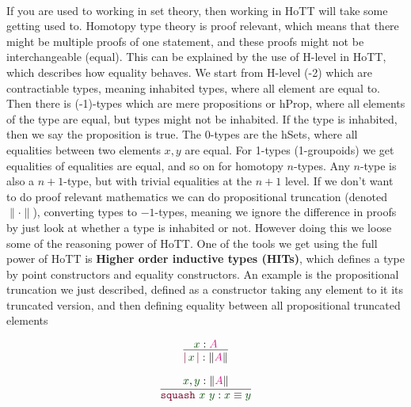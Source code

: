 \documentclass[twoside,11pt,openright]{report}
\theoremstyle{plain} %
\theoremstyle{definition}
\theoremstyle{remark}
\newcommand*{\term}[1]{\textcolor{green!30!black}{#1}} %
\newcommand*{\type}[1]{\textcolor{magenta!90!black}{#1}}
\newcommand*{\constructor}[1]{\textcolor{purple!60!black}{\ensuremath{\mathtt{#1}}}}
\begin{document}
\\ 
If you are used to working in set theory, then working in HoTT will take some getting used to. Homotopy type theory is proof relevant, which means that there might be multiple proofs of one statement, and these proofs might not be interchangeable (equal). This can be explained by the use of H-level in HoTT, which describes how equality behaves. We start from H-level (-2) which are contractiable types, meaning inhabited types, where all element are equal to. Then there is (-1)-types which are mere propositions or hProp, where all elements of the type are equal, but types might not be inhabited. If the type is inhabited, then we say the proposition is true. The 0-types are the hSets, where all equalities between two elements \(x,y\) are equal. For 1-types (1-groupoids) we get equalities of equalities are equal, and so on for homotopy \(n\)-types. Any \(n\)-type is also a \(n+1\)-type, but with trivial equalities at the \(n+1\) level. If we don't want to do proof relevant mathematics we can do propositional truncation (denoted \(\|{\cdot}\|\)), converting types to \(-1\)-types, meaning we ignore the difference in proofs by just look at whether a type is inhabited or not. However doing this we loose some of the reasoning power of HoTT. One of the tools we get using the full power of HoTT is \textbf{Higher order inductive types (HITs)}, which defines a type by point constructors and equality constructors. An example is the propositional truncation we just described, defined as a constructor taking any element to it its truncated version, and then defining equality between all propositional truncated elements\\[-9mm]
\begin{center}
  \strut
  \hfill
  \begin{minipage}[b]{0.25\linewidth}
    \begin{equation}
      \vcenter{\infer{\constructor{|}\,\term{x}\,\constructor{|} : \| \type{A} \|}{\term{x} : \type{A}}}
    \end{equation}
  \end{minipage}
  \hfill
  \begin{minipage}[b]{0.3\linewidth}
    \begin{equation}
      \vcenter{\infer{\constructor{squash}~\term{x}~\term{y} : \term{x} \equiv \term{y}}{\term{x}, \term{y} : \|\type{A}\|}}
    \end{equation}
  \end{minipage}
  \hfill
  \strut
\end{center}
\end{document}
